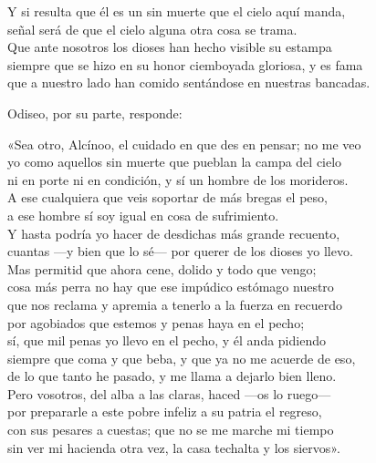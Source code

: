 \begin{versocita}
Y si resulta que él es un sin muerte que el cielo aquí manda,\\
señal será de que el cielo alguna otra cosa se trama.\\
Que ante nosotros los dioses han hecho visible su estampa\\
siempre que se hizo en su honor ciemboyada gloriosa, y es fama\\
que a nuestro lado han comido sentándose en nuestras bancadas.
\end{versocita}

Odiseo, por su parte, responde:

\begin{versocita}
«Sea otro, Alcínoo, el cuidado en que des en pensar; no me veo\\
yo como aquellos sin muerte que pueblan la campa del cielo\\
ni en porte ni en condición, y sí un hombre de los morideros.\\
A ese cualquiera que veis soportar de más bregas el peso,\\
a ese hombre sí soy igual en cosa de sufrimiento.\\
Y hasta podría yo hacer de desdichas más grande recuento,\\
cuantas ---y bien que lo sé--- por querer de los dioses yo llevo.\\
Mas permitid que ahora cene, dolido y todo que vengo;\\
cosa más perra no hay que ese impúdico estómago nuestro\\
que nos reclama y apremia a tenerlo a la fuerza en recuerdo\\
por agobiados que estemos y penas haya en el pecho;\\
sí, que mil penas yo llevo en el pecho, y él anda pidiendo\\
siempre que coma y que beba, y que ya no me acuerde de eso,\\
de lo que tanto he pasado, y me llama a dejarlo bien lleno.\\
Pero vosotros, del alba a las claras, haced ---os lo ruego---\\
por prepararle a este pobre infeliz a su patria el regreso,\\
con sus pesares a cuestas; que no se me marche mi tiempo\\
sin ver mi hacienda otra vez, la casa techalta y los siervos».
\end{versocita}

